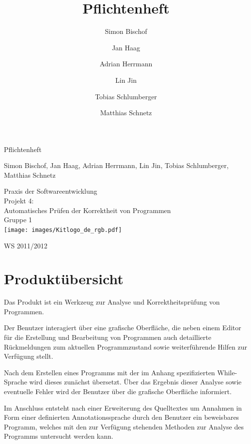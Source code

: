 \documentclass[a4paper,10pt]{article}
\title{Pflichtenheft}
\author{Simon Bischof \and Jan Haag \and Adrian Herrmann \and Lin Jin \and Tobias Schlumberger \and Matthias Schnetz}
\begin{document}
\thispagestyle {empty}
\vspace*{4cm}
\begin{center}
\begin {huge}
Pflichtenheft\\
\end{huge}
Simon Bischof, Jan Haag, Adrian Herrmann, Lin Jin, Tobias Schlumberger, Matthias Schnetz\\
\vspace{3cm}
\begin{huge}
Praxis der Softwareentwicklung \\
Projekt 4:\\
Automatisches Pr\"{u}fen der Korrektheit von Programmen\\
Gruppe 1\\
\vspace{2cm}
\texttt{[image: images/Kitlogo\_de\_rgb.pdf]}\\[0.5cm]
\end{huge}
\begin{huge}
WS 2011/2012
\end{huge}
\end{center}

\newpage
\tableofcontents
\newpage

\section{Produkt\"{u}bersicht}

Das Produkt ist ein Werkzeug zur Analyse und Korrektheitspr\"{u}fung von Programmen.

Der Benutzer interagiert \"{u}ber eine grafische Oberfl\"{a}che, die neben einem Editor f\"{u}r die Erstellung und Bearbeitung von Programmen auch detaillierte R\"{u}ckmeldungen zum aktuellen Programmzustand sowie weiterf\"{u}hrende Hilfen zur Verf\"{u}gung stellt.

Nach dem Erstellen eines Programms mit der im Anhang spezifizierten While-Sprache wird dieses zun\"{a}chst \"{u}bersetzt. \"{U}ber das Ergebnis dieser Analyse sowie eventuelle Fehler wird der Benutzer \"{u}ber die grafische Oberfl\"{a}che informiert.

Im Anschluss entsteht nach einer Erweiterung des Quelltextes um Annahmen in Form einer definierten Annotationssprache durch den Benutzer ein beweisbares Programm, welches mit den zur Verf\"{u}gung stehenden Methoden zur Analyse des Programms untersucht werden kann.
\end{document}
